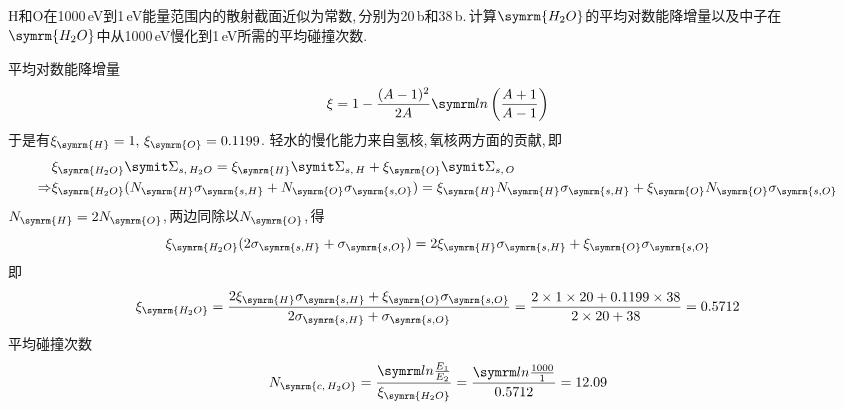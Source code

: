 \begin{exercise}
    H和O在1000\,eV到1\,eV能量范围内的散射截面近似为常数,\,分别为20\,b和38\,b.\,计算$\symrm{H_2O}$的平均对数能降增量以及中子在$\symrm{H_2O}$中从1000\,eV慢化到1\,eV所需的平均碰撞次数.\,
    \begin{solution}
        平均对数能降增量
        \begin{equation*}
            \xi = 1 - \frac{(A-1)^2}{2A}\loge\left(\frac{A+1}{A-1}\right)
        \end{equation*}
        于是有$\xi_{\symrm{H}}=1,\,\xi_{\symrm{O}}=0.1199$.
        轻水的慢化能力来自氢核,\,氧核两方面的贡献,\,即
        \begin{align*}
            &\xi_{\symrm{H_2O}}\vSigma_{s,\,H_2O} = \xi_{\symrm{H}}\vSigma_{s,\,H} + \xi_{\symrm{O}}\vSigma_{s,\,O} \\
            \Rightarrow & \xi_{\symrm{H_2O}}(N_{\symrm{H}}\sigma_{\symrm{s,H}} + N_{\symrm{O}}\sigma_{\symrm{s,O}}) = \xi_{\symrm{H}}N_{\symrm{H}}\sigma_{\symrm{s,H}} + \xi_{\symrm{O}}N_{\symrm{O}}\sigma_{\symrm{s,O}}
        \end{align*}
        $N_{\symrm{H}}=2N_{\symrm{O}}$,\,两边同除以$N_{\symrm{O}}$,\,得
        \begin{equation*}
            \xi_{\symrm{H_2O}}(2\sigma_{\symrm{s,H}} + \sigma_{\symrm{s,O}}) = 2\xi_{\symrm{H}}\sigma_{\symrm{s,H}} + \xi_{\symrm{O}}\sigma_{\symrm{s,O}}
        \end{equation*}
        即
        \begin{equation*}
            \xi_{\symrm{H_2O}} = \frac{2\xi_{\symrm{H}}\sigma_{\symrm{s,H}} + \xi_{\symrm{O}}\sigma_{\symrm{s,O}}}{2\sigma_{\symrm{s,H}} + \sigma_{\symrm{s,O}}} = \frac{2\times 1\times 20 + 0.1199\times 38}{2\times 20 + 38} = 0.5712
        \end{equation*}
        平均碰撞次数
        \begin{equation*}
            N_{\symrm{c,\,H_2O}} = \frac{\loge \frac{E_1}{E_2}}{\xi_{\symrm{H_2O}}} = \frac{\loge \frac{1000}{1}}{0.5712} = 12.09
        \end{equation*}
    \end{solution}
\end{exercise}